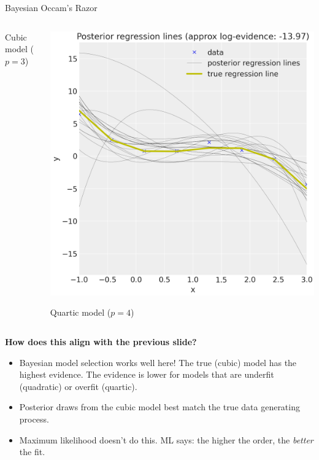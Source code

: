 \documentclass[10pt]{beamer}
\begin{document}
\begin{frame}{Bayesian Occam's Razor}
\begin{columns}
\begin{column}{0.33\textwidth}
            Cubic model ($p=3$)
        \end{column}
        \begin{column}{0.33\textwidth}
            \includegraphics[width=\columnwidth]{images/bayesian_regression_fourth_order_model}%
            
              Quartic model ($p=4$)
        \end{column}
    \end{columns}

\vfill 

{\scriptsize
\textbf{How does this align with the previous slide?} \pause 
\begin{itemize}
\item Bayesian model selection works well here!  The true (cubic) model has the highest evidence.  The evidence is lower for models that are underfit (quadratic) or overfit (quartic).
\item Posterior draws from the cubic model best match the true data generating process.
\item Maximum likelihood doesn't do this.  ML says: the higher the order, the \textit{better} the fit. 

\end{itemize}
}

\end{frame}
\end{document}

